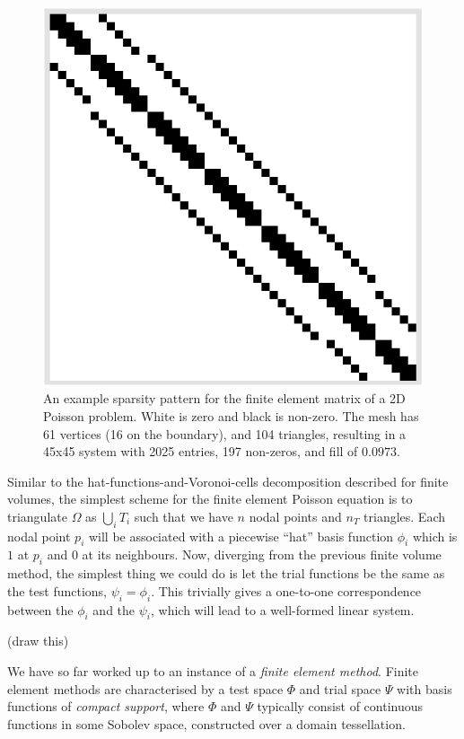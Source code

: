 \begin{figure}[H]
    \begin{center}
        \includegraphics[width=0.26\linewidth]{figures/sparsity_pattern_no_text.png}
    \end{center}
    \caption{\scriptsize
        An example sparsity pattern for the finite element matrix of a 2D Poisson problem. White is zero and black is non-zero.
        The mesh has 61 vertices (16 on the boundary), and 104 triangles, resulting in a 45x45 system with 2025 entries, 197 non-zeros, and fill of $0.0973$.
    }
    \label{sparsity_pattern}
\end{figure}


Similar to the hat-functions-and-Voronoi-cells decomposition described for finite volumes,
the simplest scheme for the finite element Poisson equation is to triangulate $\Omega$ as
    $\bigcup_i T_i$
such that we have $n$ nodal points and $n_T$ triangles.
Each nodal point $p_i$ will be associated with a piecewise ``hat'' basis function $\phi_i$ which is $1$ at $p_i$ and
$0$ at its neighbours. Now, diverging from the previous finite volume method, the simplest thing we could do is let the trial functions be the same
as the test functions, $\psi_i = \phi_i$. This trivially gives a one-to-one correspondence between the $\phi_i$ and the $\psi_i$, which will lead
to a well-formed linear system.

\vskip 0.1in
(draw this)
\vskip 0.1in


We have so far worked up to an instance of a \textit{finite element method}.
Finite element methods are characterised by a test space $\Phi$ and trial space
$\Psi$ with basis functions of \textit{compact support}, where $\Phi$ and $\Psi$ typically consist of continuous functions in
some Sobolev space, constructed over a domain tessellation.

